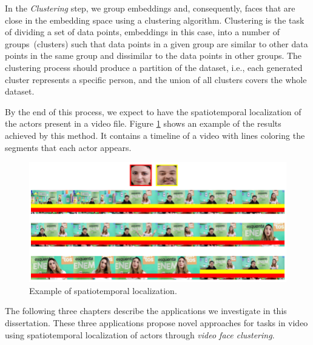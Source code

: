 In the \textit{Clustering} step, we group embeddings and, consequently, faces that are close in the embedding space using a clustering algorithm. 
%
Clustering is the task of dividing a set of data points, embeddings in this case, into a number of groups~(clusters) such that data points in a given group are similar to other data points in the same group and dissimilar to the data points in other groups.
The clustering process should produce a partition of the dataset, i.e., each generated cluster represents a specific person, and the union of all clusters covers the whole dataset.

By the end of this process, we expect to have the spatiotemporal localization of the actors present in a video file.
Figure \ref{fig:timeline} shows an example of the results achieved by this method. It contains a timeline of a video with lines coloring the segments that each actor appears.

\begin{figure}[!ht]
    \centering
    \includegraphics[width=0.8\linewidth]{img/face_clustering/example_localization.png}
    \caption{Example of spatiotemporal localization.}
    \label{fig:timeline}
\end{figure}

The following three chapters describe the applications we investigate in this dissertation. 
These three applications propose novel approaches for tasks in video using spatiotemporal localization of actors through \emph{video face clustering}.

